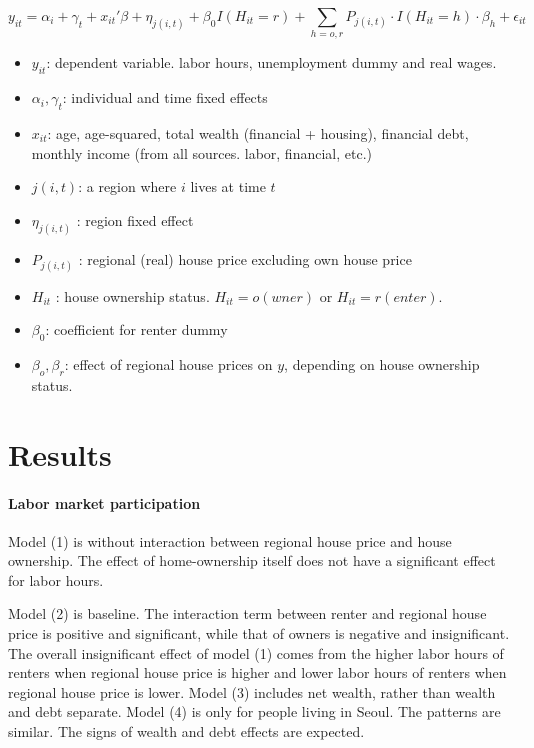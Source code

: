 \documentclass[10pt]{article}
\theoremstyle{definition}
\theoremstyle{remark}
\begin{document}
\begin{equation}
    y_{it} = \alpha_i + \gamma_t + x_{it}'\beta + \eta_{j(i,t)} +\beta_0 I(H_{it} = r) + \sum_{h=o,r} P_{j(i,t)}\cdot I(H_{it} = h)\cdot\beta_{h} + \epsilon_{it}
\end{equation}
\begin{itemize}
	\item $y_{it}$: dependent variable. labor hours, unemployment dummy and real wages.
	\item $\alpha_i,\gamma_t$: individual and time fixed effects
	\item $x_{it}$: age, age-squared, total wealth (financial + housing), financial debt, monthly income (from all sources. labor, financial, etc.)
	\item $j(i,t)$: a region where $i$ lives at time $t$
	\item $\eta_{j(i,t)}$ : region fixed effect
	\item $P_{j(i,t)}$ : regional (real) house price excluding own house price
	\item $H_{it}$ : house ownership status. $H_{it} = o(wner)$ or $H_{it}=r(enter)$.
	\item $\beta_0$: coefficient for renter dummy
	\item $\beta_o,\beta_r$: effect of regional house prices on $y$, depending on house ownership status.
\end{itemize}

\section{Results}\label{sec:result}
\paragraph{Labor market participation} Model (1) is without interaction between regional house price and house ownership. The effect of home-ownership itself does not have a significant effect for labor hours.

Model (2) is baseline. The interaction term between renter and regional house price is positive and significant, while that of owners is negative and insignificant. The overall insignificant effect of model (1) comes from the higher labor hours of renters when regional house price is higher and lower labor hours of renters when regional house price is lower. Model (3) includes net wealth, rather than wealth and debt separate. Model (4) is only for people living in Seoul. The patterns are similar. The signs of wealth and debt effects are expected. 
\end{document}
